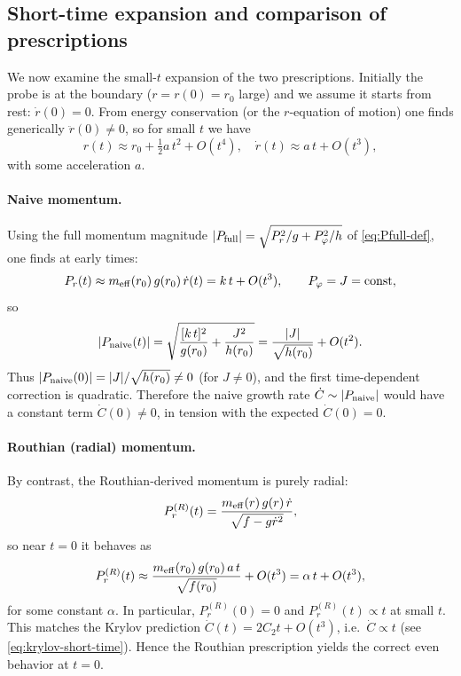 \documentclass[11pt]{article}
\begin{document}
\subsection{Short-time expansion and comparison of prescriptions}

We now examine the small-$t$ expansion of the two prescriptions.  Initially the probe is at the boundary ($r=r(0)=r_0$ large) and we assume it starts from rest: $\dot r(0)=0$.  From energy conservation (or the $r$-equation of motion) one finds generically $\ddot r(0)\neq0$, so for small $t$ we have 
\begin{equation*}
r(t)\approx r_0 + \tfrac12 a\,t^2 + O(t^4), 
\quad
\dot r(t)\approx a\,t + O(t^3),
\end{equation*}
with some acceleration $a$.  

\paragraph{Naive momentum.} Using the full momentum magnitude $|P_{\rm full}|=\sqrt{P_r^2/g+P_\varphi^2/h}$ of \eqref{eq:Pfull-def}, one finds at early times:
\begin{equation*}
P_r(t)\approx m_{\rm eff}(r_0)\,g(r_0)\,\dot r(t) = k\,t + O(t^3),
\qquad
P_\varphi = J = \text{const},
\end{equation*}
so
\begin{equation*}
|P_{\rm naive}(t)|
= \sqrt{\frac{[k\,t]^2}{g(r_0)} + \frac{J^2}{h(r_0)} }
= \frac{|J|}{\sqrt{h(r_0)}} + O(t^2).
\end{equation*}
Thus $|P_{\rm naive}(0)| = |J|/\sqrt{h(r_0)}\neq0$ (for $J\neq0$), and the first time-dependent correction is quadratic.  Therefore the naive growth rate $\dot C \sim |P_{\rm naive}|$ would have a constant term $\dot C(0)\neq0$, in tension with the expected $\dot C(0)=0$.

\paragraph{Routhian (radial) momentum.}  By contrast, the Routhian-derived momentum is purely radial:
\begin{equation*}
P_r^{(R)}(t) = \frac{m_{\rm eff}(r)\,g(r)\,\dot r}{\sqrt{f - g\dot r^2}},
\end{equation*}
so near $t=0$ it behaves as
\begin{equation*}
P_r^{(R)}(t)\approx \frac{m_{\rm eff}(r_0)\,g(r_0)\,a\,t}{\sqrt{f(r_0)}} + O(t^3)
= \alpha\,t + O(t^3),
\end{equation*}
for some constant $\alpha$.  In particular, $P_r^{(R)}(0)=0$ and $P_r^{(R)}(t)\propto t$ at small $t$.  This matches the Krylov prediction 
\(\dot C(t)=2C_2 t+O(t^3)\), i.e.\ $\dot C\propto t$ (see \eqref{eq:krylov-short-time}).  Hence the Routhian prescription yields the correct even behavior at $t=0$.
\end{document}
